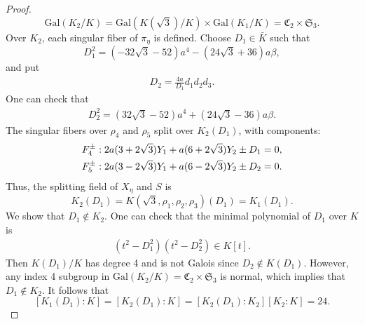 \documentclass[12pt, reqno]{amsart}
\theoremstyle{plain}
\theoremstyle{remark}
\theoremstyle{definition}
\numberwithin{equation}{section}
\def\fC{{\mathfrak C}}
\def\fS{{\mathfrak S}}
\def\fS{{\mathfrak S}}
\def\Gal{\mathrm{Gal}}
\begin{document}
\begin{proof}
$$
\Gal(K_2/K)=\Gal(K(\sqrt 3)/K)\times \Gal(K_1/K)=\fC_2\times\fS_3.
$$
Over $K_2$, each singular fiber of $\pi_\eta$ is defined. Choose $D_1\in\bar K$ such that 
$$
D_1^2=(-32\sqrt3-52)a^4-(24\sqrt3+36)a\beta,
$$
and put 
\begin{align}
    \label{eqn:I3D2}
D_2=\frac{4a}{D_1}d_1d_2d_3.
\end{align}
One can check that 
\begin{align*}
D_2^2=(32\sqrt3-52)a^4+(24\sqrt3-36)a\beta.
\end{align*}
The singular fibers over $\rho_4$ and $\rho_5$ split over $K_2(D_1)$, with components: 
\begin{align}\label{eqn:I3fiber2}
    F_4^\pm&: 2a(3+2\sqrt{3} )Y_1+a(6+2\sqrt3)Y_2\pm{D_1}=0,\\\notag
    F_5^\pm&: 2a(3-2\sqrt{3} )Y_1+a(6-2\sqrt3)Y_2\pm{D_2}=0.
\end{align}
Thus, the splitting field of $X_\eta$ and $S$ is 
$$
K_2(D_1)=K(\sqrt3,\rho_1,\rho_2,\rho_3)(D_1)=K_1(D_1).
$$
We show that $D_1\notin K_2$. 
One can check that the minimal polynomial of $D_1$ over $K$ is 
\begin{align}
 \label{eqn:I3D1mini}   
 (t^2-D_1^2)(t^2-D_2^2)\in K[t].
\end{align}
Then $K(D_1)/K$ has degree 4 and is not Galois since $D_2\not\in K(D_1)$.
However, any index 4 subgroup in $\Gal(K_2/K)=\fC_2\times\fS_3$ is normal, which implies that $D_1\notin K_2$. It follows that 
$$
[K_1(D_1):K]=[K_2(D_1):K]=[K_2(D_1):K_2][K_2:K]=24.
$$ 


\end{proof}
\end{document}
